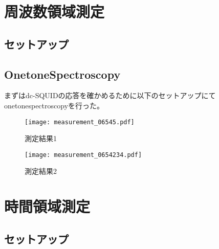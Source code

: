 \section{周波数領域測定}
    \subsection{セットアップ}
    \subsection{OnetoneSpectroscopy}
        まずはdc-SQUIDの応答を確かめるために以下のセットアップにてonetonespectroscopyを行った。
        \begin{figure}[H]
            \centering
            \texttt{[image: measurement\_06545.pdf]}
            \caption{測定結果1}
        \end{figure}

        \begin{figure}[H]
            \centering
            \texttt{[image: measurement\_0654234.pdf]}
            \caption{測定結果2}
        \end{figure}

\section{時間領域測定}
    \subsection{セットアップ}
